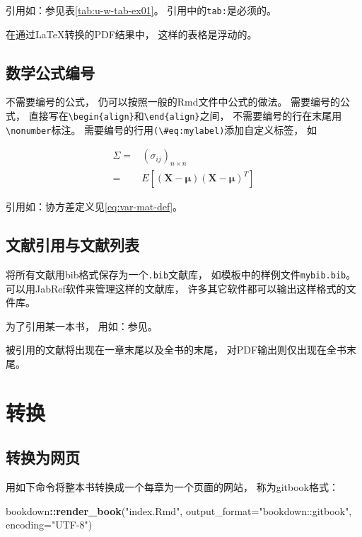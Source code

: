 \documentclass[]{book}
\newenvironment{Shaded}{\begin{snugshade}}{\end{snugshade}}
\newcommand{\DataTypeTok}[1]{\textcolor[rgb]{0.13,0.29,0.53}{#1}}
\newcommand{\KeywordTok}[1]{\textcolor[rgb]{0.13,0.29,0.53}{\textbf{#1}}}
\newcommand{\NormalTok}[1]{#1}
\newcommand{\OperatorTok}[1]{\textcolor[rgb]{0.81,0.36,0.00}{\textbf{#1}}}
\newcommand{\StringTok}[1]{\textcolor[rgb]{0.31,0.60,0.02}{#1}}
\theoremstyle{definition}
\theoremstyle{definition}
\theoremstyle{definition}
\theoremstyle{remark}
\begin{document}
引用如：参见表\ref{tab:u-w-tab-ex01}。 引用中的\texttt{tab:}是必须的。

在通过LaTeX转换的PDF结果中， 这样的表格是浮动的。

\hypertarget{usage-writing-math}{%
\subsection{数学公式编号}\label{usage-writing-math}}

不需要编号的公式， 仍可以按照一般的Rmd文件中公式的做法。
需要编号的公式，
直接写在\texttt{\textbackslash{}begin\{align\}}和\texttt{\textbackslash{}end\{align\}}之间，
不需要编号的行在末尾用\texttt{\textbackslash{}nonumber}标注。
需要编号的行用\texttt{(\textbackslash{}\#eq:mylabel)}添加自定义标签， 如

\begin{align}
\Sigma =&  (\sigma_{ij})_{n\times n} \nonumber \\
=& E[(\boldsymbol{X} - \boldsymbol{\mu}) (\boldsymbol{X} - \boldsymbol{\mu})^T ] 
\label{eq:var-mat-def}
\end{align}

引用如：协方差定义见\eqref{eq:var-mat-def}。

\subsection{文献引用与文献列表}

将所有文献用bib格式保存为一个\texttt{.bib}文献库，
如模板中的样例文件\texttt{mybib.bib}。
可以用JabRef软件来管理这样的文献库，
许多其它软件都可以输出这样格式的文件库。

为了引用某一本书， 用如：参见\citep{Wichmann1982:RNG}。

被引用的文献将出现在一章末尾以及全书的末尾，
对PDF输出则仅出现在全书末尾。

\hypertarget{usage-output}{%
\section{转换}\label{usage-output}}

\hypertarget{usage-gitbook}{%
\subsection{转换为网页}\label{usage-gitbook}}

用如下命令将整本书转换成一个每章为一个页面的网站， 称为gitbook格式：

\begin{Shaded}
\begin{Highlighting}[]
\NormalTok{bookdown}\OperatorTok{::}\KeywordTok{render_book}\NormalTok{(}\StringTok{"index.Rmd"}\NormalTok{, }
  \DataTypeTok{output_format=}\StringTok{"bookdown::gitbook"}\NormalTok{, }\DataTypeTok{encoding=}\StringTok{"UTF-8"}\NormalTok{)}
\end{Highlighting}
\end{Shaded}
\end{document}
